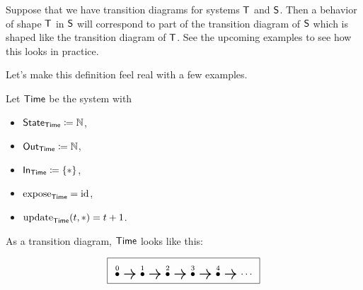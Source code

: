 \documentclass[DynamicalBook]{subfiles}
\begin{document}
\begin{remark}
  Suppose that we have transition diagrams for systems $\mathsf{T}$ and $\mathsf{S}$.
  Then a behavior of shape $\mathsf{T}$ in $\mathsf{S}$ will correspond to part of the
  transition diagram of $\mathsf{S}$ which is shaped like the transition diagram of
  $\mathsf{T}$. See the upcoming examples to see how this looks in practice.
\end{remark}

 Let's make this definition feel real with a few examples.

\begin{example}\label{ex.trajectory_as_behavior_discrete}
  Let $\mathsf{Time}$ be the system with
\begin{itemize}
\item $\mathsf{State}_{\mathsf{Time}} \coloneqq \mathbb{N}$,
\item $\mathsf{Out}_{\mathsf{Time}} \coloneqq \mathbb{N}$,
\item $\mathsf{In}_{\mathsf{Time}} \coloneqq \{\ast\}$,
\item $\mathrm{expose}_{\mathsf{Time}} = \mathrm{id}$,
\item $\mathrm{update}_{\mathsf{Time}}(t, \ast) = t + 1$.
\end{itemize}

As a transition diagram, $\mathsf{Time}$ looks like this:

\[
\begin{tikzpicture}
	\node[draw] {
  \begin{tikzcd}[column sep=small]
    \LMO{0} \ar[r, thick] & \LMO{1} \ar[r,  thick] & \LMO{2} \ar[r, thick] & \LMO{3} \ar[r, thick] & \LMO{4} \ar[r, thick] & \cdots
  \end{tikzcd}
  };
\end{tikzpicture}
\]


\end{example}
\end{document}
